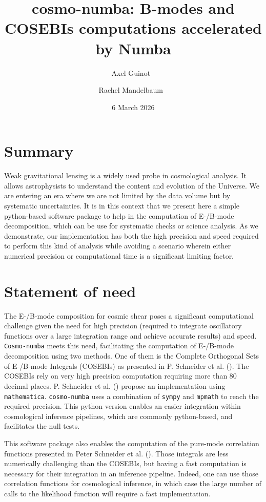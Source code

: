 \documentclass[
]{article}
\title{cosmo-numba: B-modes and COSEBIs computations accelerated by
Numba}
\author[1%
  ]{Axel Guinot%
    \,\orcidlink{0000-0002-5068-7918}\,%
    }
\author[1%
  ]{Rachel Mandelbaum%
    \,\orcidlink{0000-0003-2271-1527}\,%
    }
\affil[1]{Department of Physics, McWilliams Center for Cosmology and
Astrophysics, Carnegie Mellon University, Pittsburgh, PA 15213, USA%
  }
\date{6 March 2026}
\begin{document}
\maketitle

\section{Summary}\label{summary}

Weak gravitational lensing is a widely used probe in cosmological
analysis. It allows astrophysists to understand the content and
evolution of the Universe. We are entering an era where we are not
limited by the data volume but by systematic uncertainties. It is in
this context that we present here a simple python-based software package
to help in the computation of E-/B-mode decomposition, which can be use
for systematic checks or science analysis. As we demonstrate, our
implementation has both the high precision and speed required to perform
this kind of analysis while avoiding a scenario wherein either numerical
precision or computational time is a significant limiting factor.

\section{Statement of need}\label{statement-of-need}

The E-/B-mode composition for cosmic shear poses a significant
computational challenge given the need for high precision (required to
integrate oscillatory functions over a large integration range and
achieve accurate results) and speed. \texttt{Cosmo-numba} meets this
need, facilitating the computation of E-/B-mode decomposition using two
methods. One of them is the Complete Orthogonal Sets of E-/B-mode
Integrals (COSEBIs) as presented in P. Schneider et al.
(). The COSEBIs rely on very high
precision computation requiring more than 80 decimal places. P.
Schneider et al. () propose an
implementation using \texttt{mathematica}. \texttt{cosmo-numba} uses a
combination of \texttt{sympy} and \texttt{mpmath} to reach the required
precision. This python version enables an easier integration within
cosmological inference pipelines, which are commonly python-based, and
facilitates the null tests.

This software package also enables the computation of the pure-mode
correlation functions presented in Peter Schneider et al.
(). Those integrals are less
numerically challenging than the COSEBIs, but having a fast computation
is necessary for their integration in an inference pipeline. Indeed, one
can use those correlation functions for cosmological inference, in which
case the large number of calls to the likelihood function will require a
fast implementation.
\end{document}
